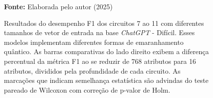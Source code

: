 \begin{figure}
\caption{Resultados do desempenho F1 dos circuitos 7 ao 11 com diferentes tamanhos de vetor de entrada na base \textit{ChatGPT} - Difícil. Esses modelos implementam diferentes formas de emaranhamento quântico. As barras comparativas do lado direito exibem a diferença percentual da métrica F1 ao se reduzir de 768 atributos para 16 atributos, divididos pela profundidade de cada circuito. As marcações que indicam semelhança estatística são advindas do teste pareado de Wilcoxon com correção de p-valor de Holm.}
\label{fig:n_features:hard:g2}
     \centering
    \centering
      \par\medskip\ABNTEXfontereduzida\selectfont\textbf{Fonte:} Elaborada pelo autor (2025) \par\medskip
\end{figure}
